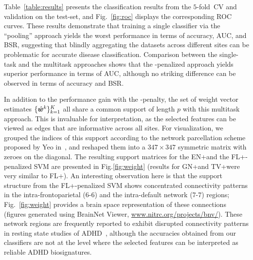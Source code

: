 Table~\ref{table:results} presents the classification results from the \mbox{$5$-fold CV} and validation on the test-set, and Fig.~\ref{fig:roc} displays the corresponding ROC curves.
These results demonstrate that training a single classifier via the ``pooling'' approach yields the worst performance in terms of accuracy, AUC, and BSR, suggesting that blindly aggregating the datasets across different sites can be problematic for accurate disease classification. 
Comparison between the single-task and the multitask approaches shows that the \MTL-penalized approach  yields superior performance in terms of AUC, although no striking difference can be observed in terms of accuracy and BSR.

In addition to the performance gain with the \MTL-penalty, the set of weight vector estimates $\{\hat{{\bm{w}}}^k\}_{k=1}^K$ all share a common support of length $p$ with this multitask approach. 
This is invaluable for interpretation, as the selected features can be viewed as edges that are informative across all sites.
For visualization, we grouped the indices of this support according to the network parcellation scheme proposed by Yeo \etal in~\cite{Yeo:2011}, and reshaped them into a $347{\times}347$ symmetric matrix with zeroes on the diagonal. 
The resulting support matrices for the EN+\MTL and the FL+\MTL-penalized SVM are presented in Fig.\hspace{2.5pt}\ref{fig:weight} (results for GN+\MTL and TV+\MTL were very similar to FL+\MTL).
An interesting observation here is that the support structure from the FL+\MTL-penalized SVM shows concentrated connectivity patterns in the intra-frontoparietal \mbox{(6-6)} and the intra-default network (7-7) regions; Fig.~\ref{fig:weight} provides a brain space representation of these connections (figures generated using BrainNet Viewer, \url{www.nitrc.org/projects/bnv/}).
These network regions are frequently reported to exhibit disrupted connectivity patterns in resting state studies of ADHD~\cite{Castellanos:2012}, although the accuracies obtained from our classifiers are not at the level where the selected features can be interpreted as reliable ADHD biosignatures. 

